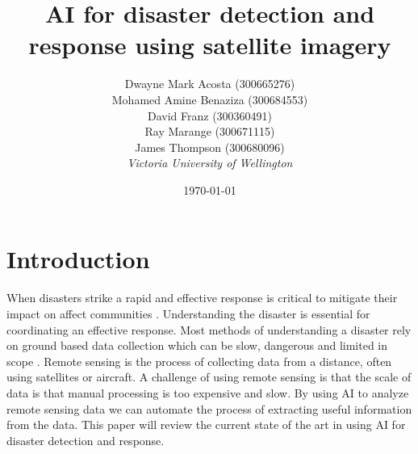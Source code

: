 \documentclass[conference,a4paper]{IEEEtran}
\begin{document}
\newcommand{\cfigure}[2]{%
  \begin{figure}[h]
    \centering
    \texttt{[image: figures/\#1.png]}%
    \caption{#2}%
    \label{fig:#1}%
  \end{figure}%

}
\title{AI for disaster detection and response using satellite imagery}

\author{Dwayne Mark Acosta (300665276) \\ Mohamed Amine Benaziza (300684553) \\ David Franz (300360491) \\ Ray Marange (300671115) \\ James Thompson (300680096)\\
\textit{Victoria University of Wellington}\\}
\date{\today}

\maketitle

\section{Introduction}


When disasters strike a rapid and effective response is critical to mitigate their impact on affect communities . Understanding the disaster is essential for coordinating an effective response. Most methods of understanding a disaster rely on ground based data collection which can be slow, dangerous and limited in scope \cite{nhess-21-1431-2021}. Remote sensing is the process of collecting data from a distance, often using satellites or aircraft. A challenge of using remote sensing is that the scale of data is that manual processing is too expensive and slow. By using AI to analyze remote sensing data we can automate the process of extracting useful information from the data. This paper will review the current state of the art in using AI for disaster detection and response.
\end{document}
